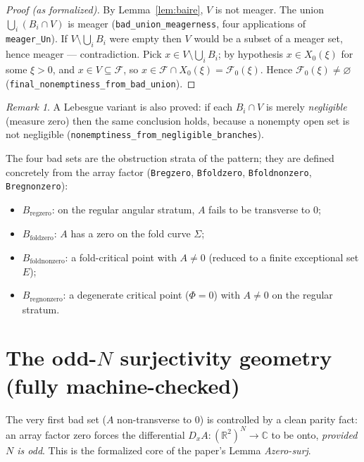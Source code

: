 \documentclass[11pt]{article}
\theoremstyle{plain}
\theoremstyle{definition}
\theoremstyle{remark}
\newtheorem{remark}[theorem]{Remark}
\newcommand{\RR}{\mathbb{R}}
\newcommand{\CC}{\mathbb{C}}
\newcommand{\Af}{A}                   %
\newcommand{\Ffeas}{\mathcal{F}}      %
\newcommand{\Fzero}{\mathcal{F}_{0}}  %
\newcommand{\Xnull}{X_{0}}
\newcommand{\code}[1]{\texttt{\small #1}}
\begin{document}
\begin{proof}[Proof (as formalized)]
By Lemma~\ref{lem:baire}, $V$ is not meager.  The union
$\bigcup_i (B_i\cap V)$ is meager (\code{bad\_union\_meagerness}, four
applications of \code{meager\_Un}).  If $V\setminus\bigcup_iB_i$ were empty then
$V$ would be a subset of a meager set, hence meager --- contradiction.  Pick
$x\in V\setminus\bigcup_iB_i$; by hypothesis $x\in\Xnull(\xi)$ for some $\xi>0$,
and $x\in V\subseteq\Ffeas$, so $x\in\Ffeas\cap\Xnull(\xi)=\Fzero(\xi)$.  Hence
$\Fzero(\xi)\ne\varnothing$ (\code{final\_nonemptiness\_from\_bad\_union}).
\end{proof}

\begin{remark}
A Lebesgue variant is also proved: if each $B_i\cap V$ is merely
\emph{negligible} (measure zero) then the same conclusion holds, because a
nonempty open set is not negligible
(\code{nonemptiness\_from\_negligible\_branches}).
\end{remark}

The four bad sets are the obstruction strata of the pattern; they are defined
concretely from the array factor (\code{Bregzero}, \code{Bfoldzero},
\code{Bfoldnonzero}, \code{Bregnonzero}):
\begin{itemize}[leftmargin=1.4em]
\item $B_{\mathrm{regzero}}$: on the regular angular stratum, $\Af$ fails to be
  transverse to $0$;
\item $B_{\mathrm{foldzero}}$: $\Af$ has a zero on the fold curve $\Sigma$;
\item $B_{\mathrm{foldnonzero}}$: a fold-critical point with $\Af\ne0$ (reduced to
  a finite exceptional set $E$);
\item $B_{\mathrm{regnonzero}}$: a degenerate critical point ($\Phi=0$) with
  $\Af\ne0$ on the regular stratum.
\end{itemize}

\section{The odd-$N$ surjectivity geometry (fully machine-checked)}\label{sec:odd}

The very first bad set ($\Af$ non-transverse to $0$) is controlled by a clean
parity fact: an array factor zero forces the differential
$D_x\Af:(\RR^2)^N\to\CC$ to be onto, \emph{provided $N$ is odd}.  This is the
formalized core of the paper's Lemma \emph{Azero-surj}.
\end{document}
